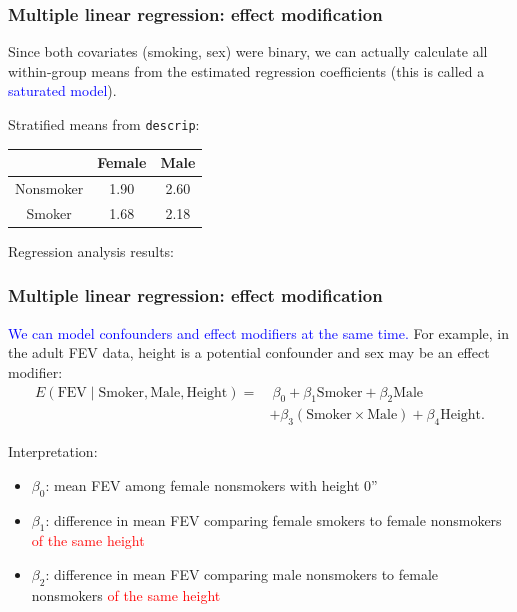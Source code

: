 \documentclass[12pt, 
hyperref={colorlinks=true, linkcolor=blue, urlcolor=cyan},dvipsnames]{beamer}
\begin{document}
\begin{frame}
\frametitle{Multiple linear regression: effect modification}

Since both covariates (smoking, sex) were binary, we can actually calculate all within-group means from the estimated regression coefficients (this is called a \textcolor{blue}{saturated model}).

Stratified means from \texttt{descrip}: {\small \begin{tabular}{|c|c|c|}
\hline
 & Female & Male \\
 \hline
Nonsmoker & 1.90 & 2.60 \\
\hline
Smoker & 1.68 & 2.18  \\
\hline
\end{tabular}
}

Regression analysis results: 
\end{frame}

\begin{frame}
\frametitle{Multiple linear regression: effect modification}

\textcolor{blue}{We can model confounders and effect modifiers at the same time.} For example, in the adult FEV data, height is a potential confounder and sex may be an effect modifier:
\begin{align*}
E(\text{FEV} \mid \text{Smoker}, \text{Male}, \text{Height}) = & \ \beta_0 + \beta_1 \text{Smoker} + \beta_2 \text{Male}\\
& + \beta_3 (\text{Smoker} \times \text{Male}) + \beta_4 \text{Height}.
\end{align*}

Interpretation: 
\begin{itemize}
\item $\beta_0$: mean FEV among female nonsmokers with height 0''
\item $\beta_1$: difference in mean FEV comparing female smokers to female nonsmokers \textcolor{red}{of the same height}
\item $\beta_2$: difference in mean FEV comparing male nonsmokers to female nonsmokers \textcolor{red}{of the same height}
\end{itemize}
\end{frame}
\end{document}
